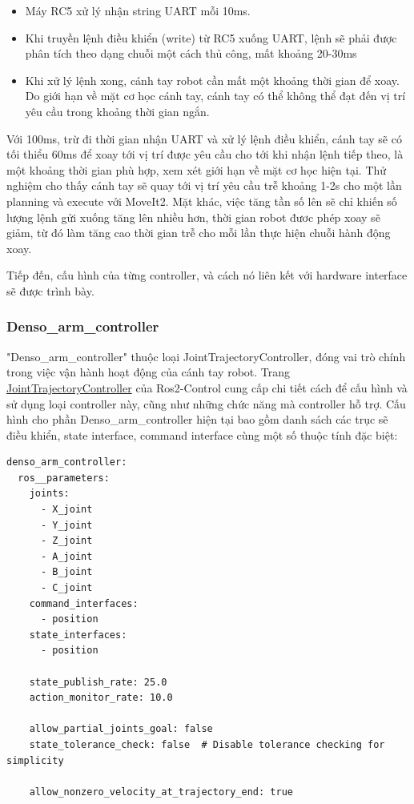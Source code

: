 \begin{itemize}
    \item Máy RC5 xử lý nhận string UART mỗi 10ms.
    \item Khi truyền lệnh điều khiển (write) từ RC5 xuống UART, lệnh sẽ phải được phân tích theo dạng chuỗi một cách thủ công, mất khoảng 20-30ms
    \item Khi xử lý lệnh xong, cánh tay robot cần mất một khoảng thời gian để xoay. Do giới hạn về mặt cơ học cánh tay, cánh tay có thể không thể đạt đến vị trí yêu cầu trong khoảng thời gian ngắn. 
\end{itemize}

Với 100ms, trừ đi thời gian nhận UART và xử lý lệnh điều khiển, cánh tay sẽ có tối thiểu 60ms để xoay tới vị trí được yêu cầu cho tới khi nhận lệnh tiếp theo, là một khoảng thời gian phù hợp, xem xét giới hạn về mặt cơ học hiện tại. Thử nghiệm cho thấy cánh tay sẽ quay tới vị trí yêu cầu trễ khoảng 1-2s cho một lần planning và execute với MoveIt2. Mặt khác, việc tăng tần số lên sẽ chỉ khiến số lượng lệnh gửi xuống tăng lên nhiều hơn, thời gian robot đươc phép xoay sẽ giảm, từ đó làm tăng cao thời gian trễ cho mỗi lần thực hiện chuỗi hành động xoay. 

Tiếp đến, cấu hình của từng controller, và cách nó liên kết với hardware interface sẽ được trình bày.

\subsubsection{Denso\_arm\_controller}

"Denso\_arm\_controller" thuộc loại JointTrajectoryController, đóng vai trò chính trong việc vận hành hoạt động của cánh tay robot. Trang \href{https://control.ros.org/humble/doc/ros2_controllers/joint_trajectory_controller/doc/userdoc.html}{JointTrajectoryController} của Ros2-Control cung cấp chi tiết cách để cấu hình và sử dụng loại controller này, cũng như những chức năng mà controller hỗ trợ. Cấu hình cho phần Denso\_arm\_controller hiện tại bao gồm danh sách các trục sẽ điều khiển, state interface, command interface cùng một số thuộc tính đặc biệt:

\begin{lstlisting}
denso_arm_controller:
  ros__parameters:
    joints:
      - X_joint
      - Y_joint
      - Z_joint
      - A_joint
      - B_joint
      - C_joint
    command_interfaces:
      - position
    state_interfaces:
      - position

    state_publish_rate: 25.0
    action_monitor_rate: 10.0

    allow_partial_joints_goal: false
    state_tolerance_check: false  # Disable tolerance checking for simplicity

    allow_nonzero_velocity_at_trajectory_end: true
\end{lstlisting}

